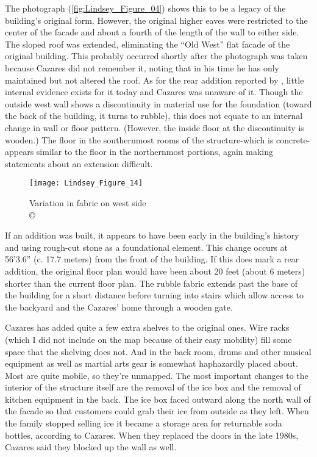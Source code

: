 The photograph (\cref{fig:Lindsey_Figure_04}) shows this to be a legacy of the building's original form. However, the original higher eaves were restricted to the center of the facade and about a fourth of the length of the wall to either side. The sloped roof was extended, eliminating the “Old West” flat facade of the original building. This probably occurred shortly after the photograph was taken because Cazares did not remember it, noting that in his time he has only maintained but not altered the roof.  As for the rear addition reported by \textcite[75-76]{hardy}, little internal evidence exists for it today and Cazares was unaware of it. Though the outside west wall shows a discontinuity in material use for the foundation (toward the back of the building, it turns to rubble), this does not equate to an internal change in wall or floor pattern. (However, the inside floor at the discontinuity is wooden.) The floor in the southernmost rooms of the structure-which is concrete-appears similar to the floor in the northernmost portions, again making statements about an extension difficult.

\begin{figure}[!htb]
	\texttt{[image: Lindsey\_Figure\_14]}
	\caption{Variation in fabric on west side\\
		{\normalfont\scriptsize \copyright\
			\shortauthor
	}}
	\label{fig:Lindsey_Figure_14}
\end{figure}

If an addition was built, it appears to have been early in the building's history and using rough-cut stone as a foundational element. This change occurs at 56'3.6” (c. \num{17.7} meters) from the front of the building. If this does mark a rear addition, the original floor plan would have been about \num{20} feet (about \num{6} meters) shorter than the current floor plan. The rubble fabric extends past the base of the building for a short distance before turning into stairs which allow access to the backyard and the Cazares’ home through a wooden gate.

Cazares has added quite a few extra shelves to the original ones. Wire racks (which I did not include on the map because of their easy mobility) fill some space that the shelving does not. And in the back room, drums and other musical equipment as well as martial arts gear is somewhat haphazardly placed about. Most are quite mobile, so they're unmapped. The most important changes to the interior of the structure itself are the removal of the ice box and the removal of kitchen equipment in the back. The ice box faced outward along the north wall of the facade so that customers could grab their ice from outside as they left. When the family stopped selling ice it became a storage area for returnable soda bottles, according to Cazares. When they replaced the doors in the late 1980s, Cazares said they blocked up the wall as well.

